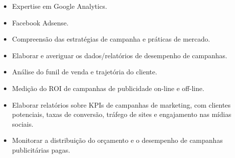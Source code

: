 \begin{itemize}[nosep,
	labelwidth=1.8em,
	labelsep=0.5em,
	leftmargin=!,
	itemsep=3pt]
	\item[\faGoogle]           Expertise em Google Analytics.
	\item[\faFacebook]         Facebook Adsense.
	\item[\faChartBar]         Compreensão das estratégias de campanha e práticas de mercado.
	\item[\faBarcode]          Elaborar e averiguar os dados/relatórios de desempenho de campanhas.
	\item[\faFunnelDollar]     Análise do funil de venda e trajetória do cliente.
	\item[\faCoins]            Medição do ROI de campanhas de publicidade on-line e off-line.
	\item[\faCopy]    Elaborar relatórios sobre KPIs de campanhas de marketing, com clientes potenciais, taxas de conversão, tráfego de sites e engajamento nas mídias sociais.
	\item[\faTrafficLight]     Monitorar a distribuição do orçamento e o desempenho de campanhas publicitárias pagas.
\end{itemize}
